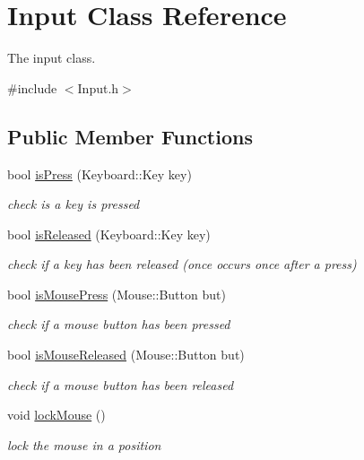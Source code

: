 \hypertarget{class_input}{\section{Input Class Reference}
\label{class_input}
}


The input class.  




{\ttfamily \#include $<$Input.\-h$>$}

\subsection*{Public Member Functions}
\begin{DoxyCompactItemize}
\item 
bool \hyperlink{class_input_a9f5845c6e557825117e57455f97bf557}{is\-Press} (Keyboard\-::\-Key key)
\begin{DoxyCompactList}\small\item\em check is a key is pressed \end{DoxyCompactList}\item 
bool \hyperlink{class_input_aadcf0bcc21873a7bb1ac6e54f74d7c76}{is\-Released} (Keyboard\-::\-Key key)
\begin{DoxyCompactList}\small\item\em check if a key has been released (once occurs once after a press) \end{DoxyCompactList}\item 
bool \hyperlink{class_input_ae263e207d1f27420a393054f60ce4f67}{is\-Mouse\-Press} (Mouse\-::\-Button but)
\begin{DoxyCompactList}\small\item\em check if a mouse button has been pressed \end{DoxyCompactList}\item 
bool \hyperlink{class_input_a049d3da4ae94d9e3ebb522d9dd3eb5de}{is\-Mouse\-Released} (Mouse\-::\-Button but)
\begin{DoxyCompactList}\small\item\em check if a mouse button has been released \end{DoxyCompactList}\item 
void \hyperlink{class_input_ad540f1ea1157518fcfc51ba303913dce}{lock\-Mouse} ()
\begin{DoxyCompactList}\small\item\em lock the mouse in a position \end{DoxyCompactList}\item 

\end{DoxyCompactItemize}
